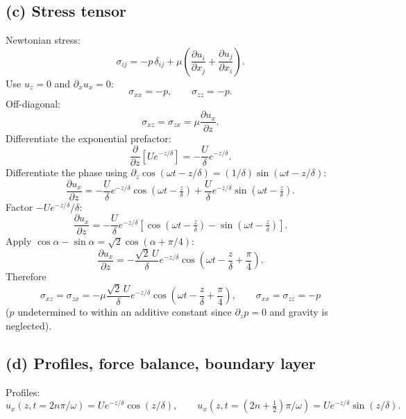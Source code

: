 \documentclass[11pt]{article}
\newcommand{\pd}[2]{\frac{\partial #1}{\partial #2}}
\begin{document}
\subsection*{(c) Stress tensor}

Newtonian stress:
\[
\sigma_{ij}=-p\,\delta_{ij}+\mu\!\left(\pd{u_i}{x_j}+\pd{u_j}{x_i}\right).
\]
Use $u_z=0$ and $\partial_x u_x=0$:
\[
\sigma_{xx}=-p,\qquad \sigma_{zz}=-p.
\]
Off-diagonal:
\[
\sigma_{xz}=\sigma_{zx}=\mu\pd{u_x}{z}.
\]
Differentiate the exponential prefactor:
\[
\pd{}{z}\!\left[Ue^{-z/\delta}\right]=-\frac{U}{\delta}e^{-z/\delta}.
\]
Differentiate the phase using $\partial_z\cos(\omega t-z/\delta)=(1/\delta)\sin(\omega t-z/\delta)$:
\[
\pd{u_x}{z}=-\frac{U}{\delta}e^{-z/\delta}\cos\!\left(\omega t-\tfrac{z}{\delta}\right)+\frac{U}{\delta}e^{-z/\delta}\sin\!\left(\omega t-\tfrac{z}{\delta}\right).
\]
Factor $-Ue^{-z/\delta}/\delta$:
\[
\pd{u_x}{z}=-\frac{U}{\delta}e^{-z/\delta}\!\left[\cos\!\left(\omega t-\tfrac{z}{\delta}\right)-\sin\!\left(\omega t-\tfrac{z}{\delta}\right)\right].
\]
Apply $\cos\alpha-\sin\alpha=\sqrt 2\cos(\alpha+\pi/4)$:
\[
\pd{u_x}{z}=-\frac{\sqrt 2\,U}{\delta}e^{-z/\delta}\cos\!\left(\omega t-\frac{z}{\delta}+\frac{\pi}{4}\right).
\]
Therefore
\[
\boxed{\;\sigma_{xz}=\sigma_{zx}=-\mu\frac{\sqrt 2\,U}{\delta}e^{-z/\delta}\cos\!\left(\omega t-\frac{z}{\delta}+\frac{\pi}{4}\right),\qquad \sigma_{xx}=\sigma_{zz}=-p\;}
\]
($p$ undetermined to within an additive constant since $\partial_z p=0$ and gravity is neglected).

\subsection*{(d) Profiles, force balance, boundary layer}

Profiles:
\[
u_x(z,t=2n\pi/\omega)=Ue^{-z/\delta}\cos(z/\delta),\qquad u_x(z,t=(2n+\tfrac12)\pi/\omega)=Ue^{-z/\delta}\sin(z/\delta).
\]

\begin{center}
\end{center}
\end{document}
